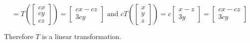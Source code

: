 \begin{example}
\[=
  T\left(\begin{bmatrix} cx \\ cy \\ cz \end{bmatrix} \right)
=
  \begin{bmatrix} cx-cz \\ 3cy \end{bmatrix}
\text{ and }
  cT\left(\begin{bmatrix} x \\ y \\ z \end{bmatrix} \right)
=
  c\begin{bmatrix} x-z \\ 3y \end{bmatrix}
=
  \begin{bmatrix} cx-cz \\ 3cy \end{bmatrix}
\]

Therefore \(T\) is a linear transformation.
\end{example}

